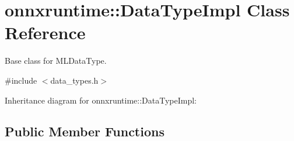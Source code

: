 \hypertarget{classonnxruntime_1_1DataTypeImpl}{}\section{onnxruntime\+:\+:Data\+Type\+Impl Class Reference}
\label{classonnxruntime_1_1DataTypeImpl}


Base class for M\+L\+Data\+Type.  




{\ttfamily \#include $<$data\+\_\+types.\+h$>$}



Inheritance diagram for onnxruntime\+:\+:Data\+Type\+Impl\+:
\subsection*{Public Member Functions}
